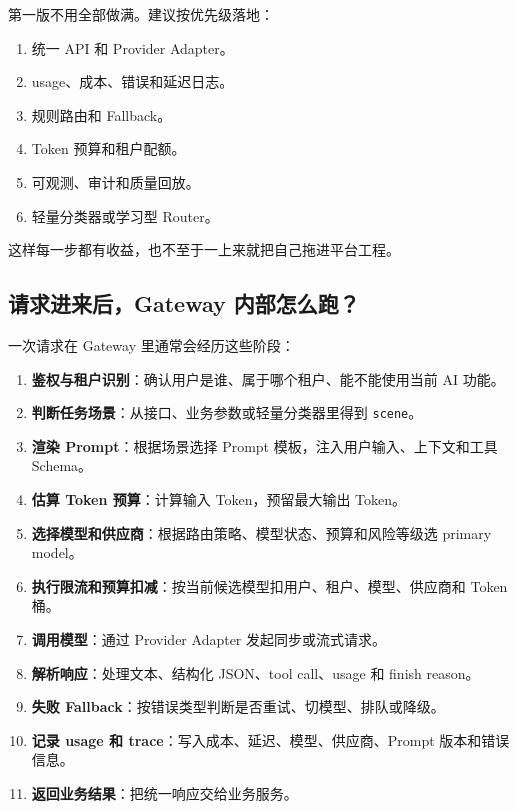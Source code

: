 \documentclass[10pt,a4paper]{ctexart}
\begin{document}
第一版不用全部做满。建议按优先级落地：


\begin{enumerate}[itemsep=2pt, topsep=4pt]
  \item 统一 API 和 Provider Adapter。
  \item usage、成本、错误和延迟日志。
  \item 规则路由和 Fallback。
  \item Token 预算和租户配额。
  \item 可观测、审计和质量回放。
  \item 轻量分类器或学习型 Router。
\end{enumerate}


这样每一步都有收益，也不至于一上来就把自己拖进平台工程。



\subsection{请求进来后，Gateway 内部怎么跑？}


一次请求在 Gateway 里通常会经历这些阶段：


\begin{enumerate}[itemsep=2pt, topsep=4pt]
  \item \textbf{鉴权与租户识别}：确认用户是谁、属于哪个租户、能不能使用当前 AI 功能。
  \item \textbf{判断任务场景}：从接口、业务参数或轻量分类器里得到 \texttt{scene}。
  \item \textbf{渲染 Prompt}：根据场景选择 Prompt 模板，注入用户输入、上下文和工具 Schema。
  \item \textbf{估算 Token 预算}：计算输入 Token，预留最大输出 Token。
  \item \textbf{选择模型和供应商}：根据路由策略、模型状态、预算和风险等级选 primary model。
  \item \textbf{执行限流和预算扣减}：按当前候选模型扣用户、租户、模型、供应商和 Token 桶。
  \item \textbf{调用模型}：通过 Provider Adapter 发起同步或流式请求。
  \item \textbf{解析响应}：处理文本、结构化 JSON、tool call、usage 和 finish reason。
  \item \textbf{失败 Fallback}：按错误类型判断是否重试、切模型、排队或降级。
  \item \textbf{记录 usage 和 trace}：写入成本、延迟、模型、供应商、Prompt 版本和错误信息。
  \item \textbf{返回业务结果}：把统一响应交给业务服务。
\end{enumerate}
\end{document}
